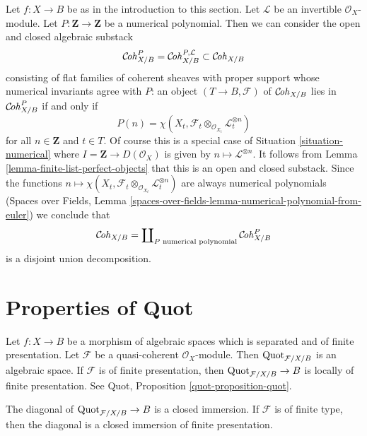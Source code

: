 \begin{example}
\label{example-hilbert-polynomial}
Let $f : X \to B$ be as in the introduction to this section.
Let $\mathcal{L}$ be an invertible $\mathcal{O}_X$-module.
Let $P : \mathbf{Z} \to \mathbf{Z}$ be a numerical polynomial.
Then we can consider the open and closed algebraic substack
$$
\mathcal{C}\!\mathit{oh}^P_{X/B} =
\mathcal{C}\!\mathit{oh}^{P, \mathcal{L}}_{X/B}
\subset \mathcal{C}\!\mathit{oh}_{X/B}
$$
consisting of flat families of coherent sheaves with proper support
whose numerical invariants agree with $P$: an object
$(T \to B, \mathcal{F})$ of $\mathcal{C}\!\mathit{oh}_{X/B}$ lies in
$\mathcal{C}\!\mathit{oh}^P_{X/B}$ if and only if
$$
P(n) =
\chi(X_t, \mathcal{F}_t \otimes_{\mathcal{O}_{X_t}} \mathcal{L}_t^{\otimes n})
$$
for all $n \in \mathbf{Z}$ and $t \in T$. Of course this is a
special case of Situation \ref{situation-numerical}
where $I = \mathbf{Z} \to D(\mathcal{O}_X)$ is given by
$n \mapsto \mathcal{L}^{\otimes n}$. It follows from
Lemma \ref{lemma-finite-list-perfect-objects}
that this is an open and closed substack. Since the functions
$n \mapsto
\chi(X_t, \mathcal{F}_t \otimes_{\mathcal{O}_{X_t}} \mathcal{L}_t^{\otimes n})$
are always numerical polynomials (Spaces over Fields, Lemma
\ref{spaces-over-fields-lemma-numerical-polynomial-from-euler})
we conclude that
$$
\mathcal{C}\!\mathit{oh}_{X/B} = \coprod\nolimits_{P\text{ numerical polynomial}}
\mathcal{C}\!\mathit{oh}^P_{X/B}
$$
is a disjoint union decomposition.
\end{example}







\section{Properties of Quot}
\label{section-quot}

\noindent
Let $f : X \to B$ be a morphism of algebraic spaces which is
separated and of finite presentation. Let $\mathcal{F}$ be a
quasi-coherent $\mathcal{O}_X$-module. Then
$\mathrm{Quot}_{\mathcal{F}/X/B}$ is an algebraic space.
If $\mathcal{F}$ is of finite presentation, then
$\mathrm{Quot}_{\mathcal{F}/X/B} \to B$ is locally of finite
presentation. See Quot, Proposition \ref{quot-proposition-quot}.

\begin{lemma}
\label{lemma-quot-diagonal-closed}
The diagonal of $\mathrm{Quot}_{\mathcal{F}/X/B} \to B$ is a closed immersion.
If $\mathcal{F}$ is of finite type, then the diagonal is a closed
immersion of finite presentation.
\end{lemma}

